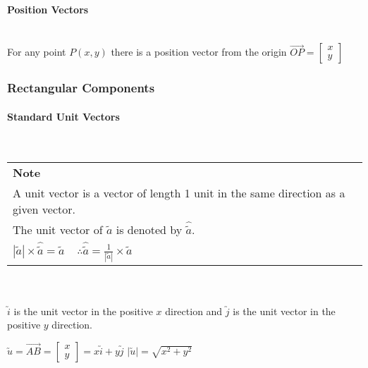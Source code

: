 \documentclass[a4paper]{article}
\newenvironment{Note}{
	\bgroup
	\def\arraystretch{1.5}
	\begin{NiceTabularX}{\textwidth}{X}
		\CodeBefore
		\columncolor{red!15}{1}
		\Body
		\textbf{Note} \\
}{
	\end{NiceTabularX}
	\egroup\mbox{}\\
}{}
\begin{document}
				\paragraph{Position Vectors}\mbox{}\\
					For any point $P(x,y)$ there is a position vector from the origin $\overrightarrow{OP}=\begin{bmatrix}
						x \\ y
					\end{bmatrix}$
			\subsubsection{Rectangular Components}
				\paragraph{Standard Unit Vectors}\mbox{}\\
					\begin{Note}
						A unit vector is a vector of length 1 unit in the same direction as a given vector.\\
						The unit vector of $\utilde{a}$ is denoted by $\hat{\utilde{a}}$.\\
						$|\utilde{a}|\times\hat{\utilde{a}}=\utilde{a}\;\;\;\;\therefore\hat{\utilde{a}}=\frac{1}{|\utilde{a}|}\times\utilde{a}$
					\end{Note}\mbox{}\\
					$\utilde{i}$ is the unit vector in the positive $x$ direction and $\utilde{j}$ is the unit vector in the positive $y$ direction.\newline
					\begin{minipage}{0.5\textwidth}
						$\utilde{u}=\overrightarrow{AB}=\begin{bmatrix}
							x \\ y
						\end{bmatrix}=x\utilde{i}+y\utilde{j}$\newline\newline
						$|\utilde{u}|=\sqrt{x^2+y^2}$
					\end{minipage}
\end{document}
